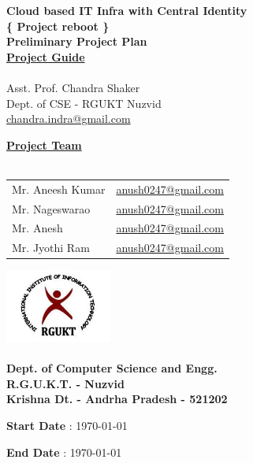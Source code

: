 \documentclass[12pt]{report}
\begin{document}
\begin{titlepage}
 \begin{center}
\LARGE
\textbf{Cloud based IT Infra with Central Identity} \\
\vfill
\large
\textbf{\{ Project reboot \}}\\
\vfill
\textbf{Preliminary Project Plan }\\
\vfill
\Large
\underline{\textbf{Project Guide }} \\ 
\large
\underline{} \\
Asst. Prof. Chandra Shaker \\
\normalsize
Dept. of CSE - RGUKT Nuzvid \\
\url{chandra.indra@gmail.com}
\vfill

\Large
\textbf{\underline{ Project Team } } \\
\underline{} \\
\large
\begin{tabular}{l l}
Mr. Aneesh Kumar & \normalsize \url{anush0247@gmail.com} \\
Mr. Nageswarao  & \normalsize \url{anush0247@gmail.com} \\
Mr. Anesh  & \normalsize \url{anush0247@gmail.com} \\
Mr. Jyothi Ram & \normalsize \url{anush0247@gmail.com} 
\end{tabular}

\vfill


\includegraphics[width=3.5cm]{rgukt_logo.jpg} 
\Large
\underline{} \\
\underline{} \\
\normalsize
\textbf{Dept. of Computer Science and Engg. } \\
\textbf{R.G.U.K.T. - Nuzvid } \\
\textbf{Krishna Dt. - Andrha Pradesh - 521202}


\normalsize
\vfill
\begin{multicols}{2}
\begin{flushleft}
\textbf{Start Date} : \today \\
\end{flushleft}


\begin{flushright}
\textbf{End Date} :  \today \\
\end{flushright}
\end{multicols}


\end{center}
\end{titlepage}
\end{document}
